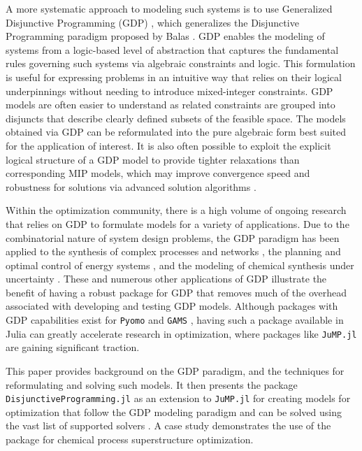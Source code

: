 \documentclass{juliacon}
\begin{document}
A more systematic approach to modeling such systems is to use Generalized Disjunctive Programming (GDP) \cite{chen_grossmann_2019, grossmann_trespalacios_2013}, which generalizes the Disjunctive Programming paradigm proposed by Balas \cite{balas_2018}. GDP enables the modeling of systems from a logic-based level of abstraction that captures the fundamental rules governing such systems via algebraic constraints and logic. This formulation is useful for expressing problems in an intuitive way that relies on their logical underpinnings without needing to introduce mixed-integer constraints. GDP models are often easier to understand as related constraints are grouped into disjuncts that describe clearly defined subsets of the feasible space. The models obtained via GDP can be reformulated into the pure algebraic form best suited for the application of interest.  It is also often possible to exploit the explicit logical structure of a GDP model to provide tighter relaxations than corresponding MIP models, which may improve convergence speed and robustness for solutions via advanced solution algorithms \cite{chen_grossmann_2019}.

Within the optimization community, there is a high volume of ongoing research that relies on GDP to formulate models for a variety of applications. Due to the combinatorial nature of system design problems, the GDP paradigm has been applied to the synthesis of complex processes and networks \cite{MATOVU2022107856, ZHOU202269}, the planning and optimal control of energy systems \cite{CHO2022841}, and the modeling of chemical synthesis under uncertainty \cite{CHEN2022107616}. These and numerous other applications of GDP illustrate the benefit of having a robust package for GDP that removes much of the overhead associated with developing and testing GDP models. Although packages with GDP capabilities exist for \verb|Pyomo| \cite{chen2022pyomo} and \verb|GAMS| \cite{vecchietti1999logmip}, having such a package available in Julia can greatly accelerate research in optimization, where packages like \verb|JuMP.jl| \cite{dunning_huchette_lubin_2017} are gaining significant traction.

This paper provides background on the GDP paradigm, and the techniques for reformulating and solving such models. It then presents the package \verb|DisjunctiveProgramming.jl| as an extension to \verb|JuMP.jl| for creating models for optimization that follow the GDP modeling paradigm and can be solved using the vast list of supported solvers \cite{dunning_huchette_lubin_2017}. A case study demonstrates the use of the package for chemical process superstructure optimization.
\end{document}

